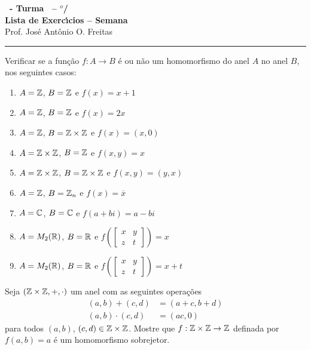 \documentclass[12pt]{exam}
\begin{document}
    \begin{center}
    {\Large\bf \disciplina\ - Turma \turma\ -- \semestre$^{o}$/\ano} \\ \vspace{9pt} {\large\bf
        Lista de Exerc{\'\i}cios -- Semana \numerosemana}\\ \vspace{9pt} Prof. Jos{\'e} Ant{\^o}nio O. Freitas
    \end{center}
    \hrule

    \vspace{.6cm}

     Verificar se a fun\c{c}\~ao $f : A \to B$ \'e ou n\~ao um homomorfismo do anel $A$ no anel $B$, nos seguintes casos:
\begin{enumerate}[label=({\alph*})]
\item $A = \mathbb{Z}$, $B = \mathbb{Z}$ e $f(x) = x + 1$
\item $A = \mathbb{Z}$, $B = \mathbb{Z}$ e $f(x) = 2x$
\item $A = \mathbb{Z}$, $B = \mathbb{Z} \times \mathbb{Z}$ e $f(x) = (x, 0)$
\item $A = \mathbb{Z} \times \mathbb{Z}$, $B = \mathbb{Z}$ e $f(x,y) = x$
\item $A = \mathbb{Z} \times \mathbb{Z}$, $B = \mathbb{Z} \times \mathbb{Z}$ e $f(x,y) = (y,x)$
\item $A = \mathbb{Z}$, $B = \mathbb{Z}_n$ e $f(x) = \overline{x}$
\item $A = \mathbb{C}$, $B = \mathbb{C}$ e $f(a + bi) = a - bi$
\item $A = M_2(\mathbb{R})$, $B = \mathbb{R}$ e $f\left(\begin{bmatrix}
    x & y\\z & t
\end{bmatrix}\right) = x$
\item $A = M_2(\mathbb{R})$, $B = \mathbb{R}$ e $f\left(\begin{bmatrix}
    x & y\\z & t
\end{bmatrix}\right) = x + t$
\end{enumerate}

\vspace{.3cm}

\questao{} Seja $(\mathbb{Z}\times\mathbb{Z}, +, \cdot)$ um anel com as seguintes opera\c{c}\~oes
\begin{align*}
    (a, b) + (c, d) &= (a + c, b + d)\\
    (a, b)\cdot (c, d) &= (ac, 0)
\end{align*}
para todos $(a, b)$, $(c, d) \in \mathbb{Z}\times\mathbb{Z}$.
Mostre que $ f : \mathbb{Z}\times\mathbb{Z} \to \mathbb{Z}$ definada por $f(a, b) = a$ \'e um homomorfismo sobrejetor.
\end{document}
